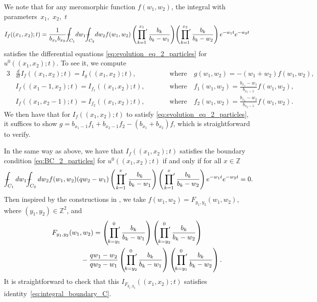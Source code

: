 \documentclass[pdftex]{sigma}
\numberwithin{equation}{section}
\def\Xint#1{\mathchoice
{\XXint\displaystyle\textstyle{#1}}%
{\XXint\textstyle\scriptstyle{#1}}%
{\XXint\scriptstyle\scriptscriptstyle{#1}}%
{\XXint\scriptscriptstyle\scriptscriptstyle{#1}}%
\!\int}
\def\XXint#1#2#3{{\setbox0=\hbox{$#1{#2#3}{\int}$}
\vcenter{\hbox{$#2#3$}}\kern-.5\wd0}}
\def\dashint{\Xint-}
\newcommand{\intZ}{\mathbb{Z}}
\newcommand{\prodprime}{\sideset{}{'}\prod}
\begin{document}
We note that for any meromorphic function $f(w_1, w_2)$, the integral with parameters~$x_1$,~$x_2$,~$t$
\begin{gather*}
 I_f((x_1, x_2); t) = \frac{1}{b_{x_1} b_{x_2}} \dashint_{C_1} \! dw_1 \dashint_{C_2} \! dw_2 f(w_1, w_2) \left( \prodprime^{x_1}_{k = 1} \frac{b_k}{b_k - w_1} \right) \! \left( \prodprime^{x_2}_{k = 1} \frac{b_k}{b_k - w_2} \right) e^{-w_1 t} e^{-w_2 t}
\end{gather*}
satisf\/ies the dif\/ferential equations \eqref{eq:evolution_eq_2_particles} for $u^0((x_1, x_2); t)$. To see it, we compute
\begin{alignat*}{3}
 & \frac{d}{dt} I_f((x_1, x_2); t) =   I_g((x_1, x_2); t), \qquad && \text{where} \quad  g(w_1, w_2) =   -(w_1 + w_2) f(w_1, w_2),& \\
& I_f((x_1 - 1, x_2); t) =   I_{f_1}((x_1, x_2); t), \qquad && \text{where} \quad f_1(w_1, w_2) =   \frac{b_{x_1} - w_1}{b_{x_1 - 1}} f(w_1, w_2),& \\
& I_f((x_1, x_2 - 1); t) =   I_{f_2}((x_1, x_2); t), \qquad && \text{where} \quad  f_2(w_1, w_2) =   \frac{b_{x_2} - w_2}{b_{x_2 - 1}} f(w_1, w_2).&
\end{alignat*}
We then have that for $I_f((x_1, x_2); t)$ to satisfy \eqref{eq:evolution_eq_2_particles}, it suf\/f\/ices to show $g = b_{x_1 - 1} f_1 + b_{x_2 - 1} f_2 - (b_{x_1} + b_{x_2}) f$, which is straightforward to verify.

In the same way as above, we have that $I_f((x_1, x_2); t)$ satisf\/ies the boundary condition \eqref{eq:BC_2_particles} for $u^0((x_1, x_2); t)$ if and only if for all $x \in \intZ$
\begin{gather} \label{eq:integral_boundary_C}
 \dashint_{C_1} dw_1 \dashint_{C_2} dw_2 f(w_1, w_2) (qw_2 - w_1) \left( \prodprime^x_{k = 1} \frac{b_k}{b_k - w_1} \right) \left( \prodprime^x_{k = 1} \frac{b_k}{b_k - w_2} \right) e^{-w_1 t} e^{-w_2 t} = 0.\!\!\!
\end{gather}
Then inspired by the constructions in \cite{Korhonen-Lee14}, we take $f(w_1, w_2) = F_{y_1, y_2}(w_1, w_2)$, where $(y_1, y_2) \in \intZ^2$, and
\begin{gather*}
 F_{y_1, y_2}(w_1, w_2) = \left( \prodprime^0_{k = y_1} \frac{b_k}{b_k - w_1} \right) \left( \prodprime^0_{k = y_2} \frac{b_k}{b_k - w_2} \right) \\
 \hphantom{F_{y_1, y_2}(w_1, w_2) =}{}
 - \frac{qw_1 - w_2}{qw_2 - w_1} \left( \prodprime^0_{k = y_2} \frac{b_k}{b_k - w_1} \right) \left( \prodprime^0_{k = y_1} \frac{b_k}{b_k - w_2} \right).
\end{gather*}
It is straightforward to check that this $I_{F_{y_1, y_2}}((x_1, x_2); t)$ satisf\/ies identity~\eqref{eq:integral_boundary_C}.
\end{document}
